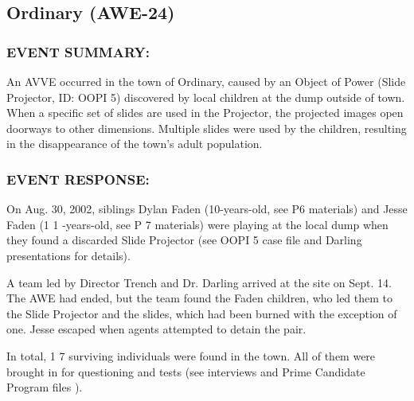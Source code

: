 \subsection*{Ordinary (AWE-24)}
\subsubsection*{EVENT SUMMARY:}
\par An AVVE occurred in the town of Ordinary, caused by an Object
of Power (Slide Projector, ID: OOPI 5) discovered by local
children at the dump outside of town. When a specific set of
slides are used in the Projector, the projected images open
doorways to other dimensions. Multiple slides were used by the
children, resulting in the disappearance of the town's adult
population.
\subsubsection*{EVENT RESPONSE:}
\par On Aug. 30, 2002, siblings Dylan Faden (10-years-old, see P6
materials) and Jesse Faden (1 1 -years-old, see P 7 materials) were
playing at the local dump when they found a discarded Slide
Projector (see OOPI 5 case file and Darling presentations 
for details).
\par A team led by Director Trench and Dr. Darling arrived at the site
on Sept. 14. The AWE had ended, but the team found the Faden
children, who led them to the Slide Projector and the slides,
which had been burned with the exception of one. Jesse escaped
when agents attempted to detain the pair.
\par In total, 1 7 surviving individuals were found in the town. All of
them were brought in for questioning and tests (see interviews 
and Prime Candidate Program files ).